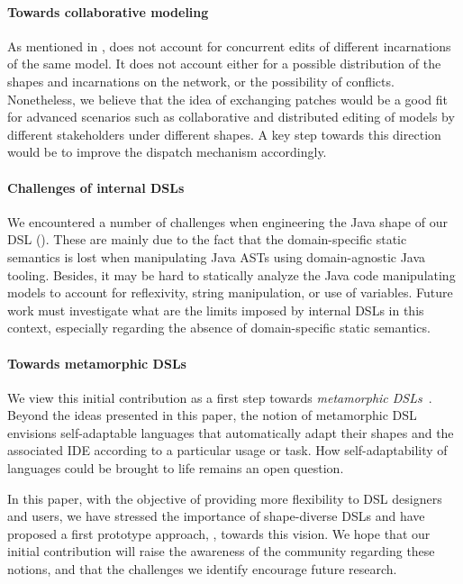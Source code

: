 \paragraph{Towards collaborative modeling}
As mentioned in , \prism does not account for concurrent edits of different incarnations of the same model.
It does not account either for a possible distribution of the shapes and incarnations on the network, or the possibility of conflicts.
Nonetheless, we believe that the idea of exchanging patches would be a good fit for advanced scenarios such as collaborative and distributed editing of models by different stakeholders under different shapes.
A key step towards this direction would be to improve the dispatch mechanism accordingly.

\paragraph{Challenges of internal DSLs}
We encountered a number of challenges when engineering the Java shape of our DSL ().
These are mainly due to the fact that the domain-specific static semantics is lost when manipulating Java ASTs using domain-agnostic Java tooling.
Besides, it may be hard to statically analyze the Java code manipulating models to account for reflexivity, string manipulation, or use of variables.
Future work must investigate what are the limits imposed by internal DSLs in this context, especially regarding the absence of domain-specific static semantics.


\paragraph{Towards metamorphic DSLs}
We view this initial contribution as a first step towards \emph{metamorphic DSLs}~\cite{acher2014metamorphic}.
Beyond the ideas presented in this paper, the notion of metamorphic DSL envisions self-adaptable languages that automatically adapt their shapes and the associated IDE according to a particular usage or task.
How self-adaptability of languages could be brought to life remains an open question.

\vspace{1em}
In this paper, with the objective of providing more flexibility to DSL designers and users, we have stressed the importance of shape-diverse DSLs and have proposed a first prototype approach, \prism, towards this vision.
We hope that our initial contribution will raise the awareness of the community regarding these notions, and that the challenges we identify encourage future research.
